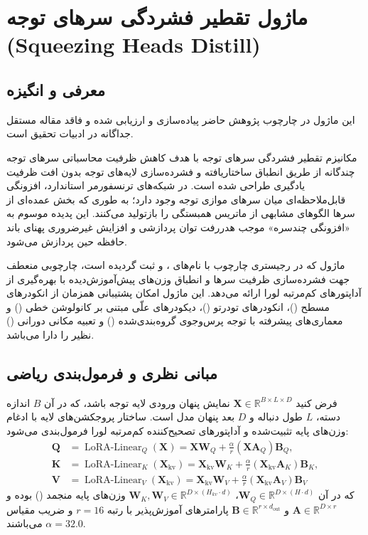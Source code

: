 \section{ماژول تقطیر فشردگی سرهای توجه (Squeezing Heads Distill)}
\label{sec:module_squeezing_heads_distill}

\subsection{معرفی و انگیزه}
این ماژول در چارچوب پژوهش حاضر پیاده‌سازی و ارزیابی شده و فاقد مقاله مستقل جداگانه در ادبیات تحقیق است.

مکانیزم تقطیر فشردگی سرهای توجه  با هدف کاهش ظرفیت محاسباتی سرهای توجه چندگانه از طریق انطباق ساختاریافته و فشرده‌سازی لایه‌های توجه بدون افت ظرفیت یادگیری طراحی شده است. در شبکه‌های ترنسفورمر استاندارد، افزونگی قابل‌ملاحظه‌ای میان سرهای موازی توجه وجود دارد؛ به طوری که بخش عمده‌ای از سرها الگوهای مشابهی از ماتریس همبستگی را بازتولید می‌کنند. این پدیده موسوم به «افزونگی چندسره» موجب هدررفت توان پردازشی و افزایش غیرضروری پهنای باند حافظه حین پردازش می‌شود.

ماژول  که در رجیستری چارچوب با نام‌های ،  و  ثبت گردیده است، چارچوبی منعطف جهت فشرده‌سازی ظرفیت سرها و انطباق وزن‌های پیش‌آموزش‌دیده با بهره‌گیری از آداپتورهای کم‌مرتبه لورا  ارائه می‌دهد. این ماژول امکان پشتیبانی همزمان از انکودرهای مسطح ()، انکودرهای تودرتو ()، دیکودرهای علّی مبتنی بر کانولوشن خطی () و معماری‌های پیشرفته با توجه پرس‌وجوی گروه‌بندی‌شده () و تعبیه مکانی دورانی () نظیر  را دارا می‌باشد.

\subsection{مبانی نظری و فرمول‌بندی ریاضی}
فرض کنید $\mathbf{X} \in \mathbb{R}^{B \times L \times D}$ نمایش پنهان ورودی لایه توجه باشد، که در آن $B$ اندازه دسته، $L$ طول دنباله و $D$ بعد پنهان مدل است. ساختار پروجکشن‌های لایه با ادغام وزن‌های پایه تثبیت‌شده و آداپتورهای تصحیح‌کننده کم‌مرتبه لورا فرمول‌بندی می‌شود:
\begin{align}
\mathbf{Q} &= \operatorname{LoRA-Linear}_Q(\mathbf{X}) = \mathbf{X} \mathbf{W}_Q + \frac{\alpha}{r} (\mathbf{X} \mathbf{A}_Q) \mathbf{B}_Q, \\
\mathbf{K} &= \operatorname{LoRA-Linear}_K(\mathbf{X}_{\text{kv}}) = \mathbf{X}_{\text{kv}} \mathbf{W}_K + \frac{\alpha}{r} (\mathbf{X}_{\text{kv}} \mathbf{A}_K) \mathbf{B}_K, \\
\mathbf{V} &= \operatorname{LoRA-Linear}_V(\mathbf{X}_{\text{kv}}) = \mathbf{X}_{\text{kv}} \mathbf{W}_V + \frac{\alpha}{r} (\mathbf{X}_{\text{kv}} \mathbf{A}_V) \mathbf{B}_V
\end{align}
که در آن $\mathbf{W}_Q \in \mathbb{R}^{D \times (H \cdot d)}$، $\mathbf{W}_K, \mathbf{W}_V \in \mathbb{R}^{D \times (H_{kv} \cdot d)}$ وزن‌های پایه منجمد () بوده و $\mathbf{A} \in \mathbb{R}^{D \times r}$ و $\mathbf{B} \in \mathbb{R}^{r \times d_{\text{out}}}$ پارامترهای آموزش‌پذیر با رتبه $r = 16$ و ضریب مقیاس $\alpha = 32.0$ می‌باشند.

